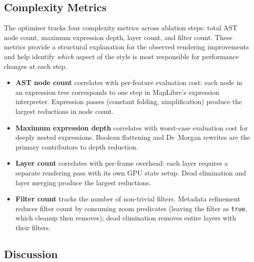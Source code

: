 \subsection{Complexity Metrics}\label{sub_combined_complexity}

The optimiser tracks four complexity metrics across ablation steps: total \ac{AST} node count, maximum expression depth, layer count, and filter count.
These metrics provide a structural explanation for the observed rendering improvements and help identify \emph{which} aspect of the style is most responsible for performance changes at each step.

\begin{itemize}
    \item \textbf{\ac{AST} node count} correlates with per-feature evaluation cost: each node in an expression tree corresponds to one step in MapLibre's expression interpreter.
    Expression passes (constant folding, simplification) produce the largest reductions in node count.
    \item \textbf{Maximum expression depth} correlates with worst-case evaluation cost for deeply nested expressions.
    Boolean flattening and De~Morgan rewrites are the primary contributors to depth reduction.
    \item \textbf{Layer count} correlates with per-frame overhead: each layer requires a separate rendering pass with its own GPU state setup.
    Dead elimination and layer merging produce the largest reductions.
    \item \textbf{Filter count} tracks the number of non-trivial filters.
    Metadata refinement reduces filter count by consuming zoom predicates (leaving the filter as \texttt{true}, which cleanup then removes); dead elimination removes entire layers with their filters.
\end{itemize}

\subsection{Discussion}\label{sub_combined_discussion}

